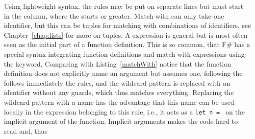 Using lightweight syntax, the rules may be put on separate lines but must start in the column, where the  starts or greater. Match with can only take one identifier, but this can be tuples for matching with combinations of identifiers, see Chapter~\ref{chap:lists} for more on tuples. A  expression is general but is most often seen as the initial part of a function definition. This is so common, that F\# has a special syntax integrating function definitions and match with expressions using the  keyword,
%
%
Comparing with Listing~\ref{matchWith} notice that the function definition does not explicitly name an argument but assumes one, following the  follows immediately the rules, and the wildcard pattern \lexeme{_} is replaced with an identifier without any guards, which thus matches everything. Replacing the wildcard pattern with a name has the advantage that this name can be used locally in the expression belonging to this rule, i.e., it acts as a \lstinline!let n = ! on the implicit argument of the function. Implicit arguments makes the code hard to read and, thus 

